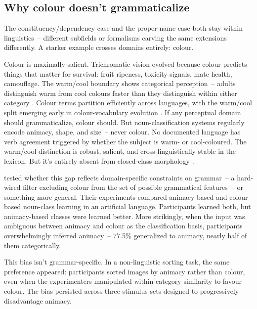 \subsection{Why colour doesn't grammaticalize}
\label{sec:7:colour}

The constituency/dependency case and the proper-name case both stay within linguistics~-- different subfields or formalisms carving the same extensions differently. A starker example crosses domains entirely: colour.

Colour is maximally salient. Trichromatic vision evolved because colour predicts things that matter for survival: fruit ripeness, toxicity signals, mate health, camouflage. The warm/cool boundary shows categorical perception~-- adults distinguish warm from cool colours faster than they distinguish within either category \citep{holmes2017}. Colour terms partition efficiently across languages, with the warm/cool split emerging early in colour-vocabulary evolution \citep{kay1978}. If any perceptual domain should grammaticalize, colour should. But noun-classification systems regularly encode animacy, shape, and size~-- never colour. No documented language has verb agreement triggered by whether the subject is warm- or cool-coloured. The warm/cool distinction is robust, salient, and cross-linguistically stable in the lexicon. But it's entirely absent from closed-class morphology \citep{seifart2010}.

\textcite{prasertsom2026} tested whether this gap reflects domain-specific constraints on grammar~-- a hard-wired filter excluding colour from the set of possible grammatical features~-- or something more general. Their experiments compared animacy-based and colour-based noun-class learning in an artificial language. Participants learned both, but animacy-based classes were learned better. More strikingly, when the input was ambiguous between animacy and colour as the classification basis, participants overwhelmingly inferred animacy~-- 77.5\% generalized to animacy, nearly half of them categorically.

This bias isn't grammar-specific. In a non-linguistic sorting task, the same preference appeared: participants sorted images by animacy rather than colour, even when the experimenters manipulated within-category similarity to favour colour. The bias persisted across three stimulus sets designed to progressively disadvantage animacy.


